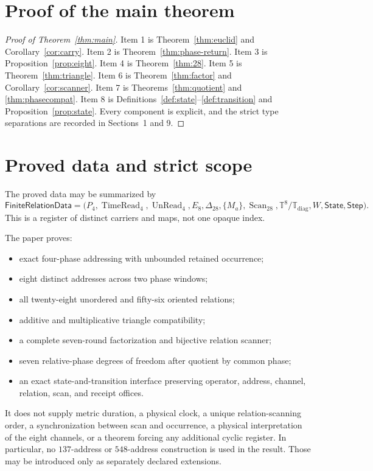 \documentclass[11pt,letterpaper]{article}
\theoremstyle{relationstyle}
\newcommand{\T}{\mathbb{T}}
\newcommand{\TimeRead}{\operatorname{TimeRead}_4}
\newcommand{\UnRead}{\operatorname{UnRead}_4}
\newcommand{\Scan}{\operatorname{Scan}_{28}}
\newcommand{\State}{\mathsf{State}}
\newcommand{\Step}{\mathsf{Step}}
\newcommand{\diagT}{\T_{\mathrm{diag}}}
\begin{document}
\section{Proof of the main theorem}\label{sec:proof-main}

\begin{proof}[Proof of Theorem~\ref{thm:main}]
Item 1 is Theorem~\ref{thm:euclid} and Corollary~\ref{cor:carry}.  Item 2 is Theorem~\ref{thm:phase-return}.  Item 3 is Proposition~\ref{prop:eight}.  Item 4 is Theorem~\ref{thm:28}.  Item 5 is Theorem~\ref{thm:triangle}.  Item 6 is Theorem~\ref{thm:factor} and Corollary~\ref{cor:scanner}.  Item 7 is Theorems~\ref{thm:quotient} and \ref{thm:phasecompat}.  Item 8 is Definitions~\ref{def:state}--\ref{def:transition} and Proposition~\ref{prop:state}.  Every component is explicit, and the strict type separations are recorded in Sections~1 and 9.
\end{proof}

\section{Proved data and strict scope}\label{sec:scope}

The proved data may be summarized by
\[
\mathsf{FiniteRelationData}
=
\bigl(
P_4,\TimeRead,\UnRead,
E_8,\Delta_{28},
\{M_a\},\Scan,
\T^8/\diagT,
W,\State,\Step
\bigr).
\]
This is a register of distinct carriers and maps, not one opaque index.

The paper proves:
\begin{itemize}
  \item exact four-phase addressing with unbounded retained occurrence;
  \item eight distinct addresses across two phase windows;
  \item all twenty-eight unordered and fifty-six oriented relations;
  \item additive and multiplicative triangle compatibility;
  \item a complete seven-round factorization and bijective relation scanner;
  \item seven relative-phase degrees of freedom after quotient by common phase;
  \item an exact state-and-transition interface preserving operator, address, channel, relation, scan, and receipt offices.
\end{itemize}

It does not supply metric duration, a physical clock, a unique relation-scanning order, a synchronization between scan and occurrence, a physical interpretation of the eight channels, or a theorem forcing any additional cyclic register.  In particular, no $137$-address or $548$-address construction is used in the result.  Those may be introduced only as separately declared extensions.
\end{document}
